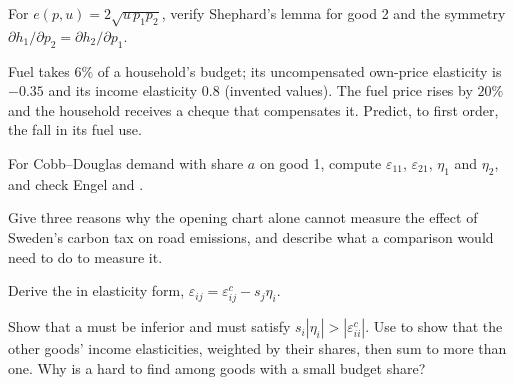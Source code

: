 \begin{exercise}[$\star\star$]\label{exo:b1:income-and-substitution-effects:shephard}
For $e(p, u) = 2\sqrt{u\,p_1p_2}$, verify Shephard's lemma for good 2 and the
symmetry $\partial h_1/\partial p_2 = \partial h_2/\partial p_1$.
\end{exercise}

\begin{exercise}[$\star\star$]\label{exo:b1:income-and-substitution-effects:fuel}
Fuel takes $6\%$ of a household's budget; its uncompensated own-price
elasticity is $-0.35$ and its income elasticity $0.8$ (invented values). The
fuel price rises by $20\%$ and the household receives a cheque that
compensates it. Predict, to first order, the fall in its fuel use.
\end{exercise}

\begin{exercise}[$\star\star$]\label{exo:b1:income-and-substitution-effects:cournot}
For Cobb--Douglas demand with share $a$ on good 1, compute $\varepsilon_{11}$,
$\varepsilon_{21}$, $\eta_1$ and $\eta_2$, and check Engel and .
\end{exercise}

\begin{exercise}[$\star\star$]\label{exo:b1:income-and-substitution-effects:chart}
Give three reasons why the opening chart alone cannot measure the effect
of Sweden's carbon tax on road emissions, and describe what a comparison
would need to do to measure it.
\end{exercise}

\begin{exercise}[$\star\star\star$]\label{exo:b1:income-and-substitution-effects:elasticity}
Derive the  in elasticity form,
$\varepsilon_{ij} = \varepsilon^{c}_{ij} - s_j\eta_i$.
\end{exercise}

\begin{exercise}[$\star\star\star$]\label{exo:b1:income-and-substitution-effects:giffen-share}
Show that a  must be inferior and must satisfy
$s_i|\eta_i| > |\varepsilon^c_{ii}|$. Use  to show that the
other goods' income elasticities, weighted by their shares, then sum to more
than one. Why is a  hard to find among goods with a small budget
share?
\end{exercise}

